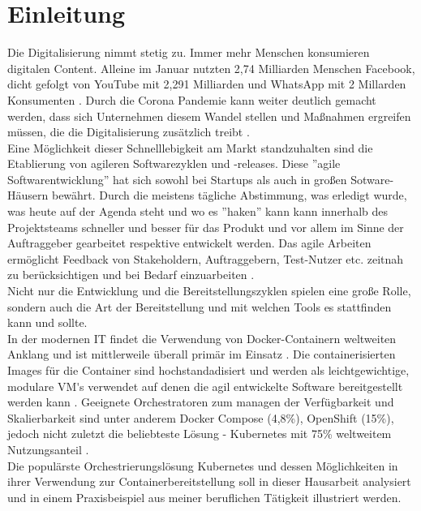 \section{Einleitung}

Die Digitalisierung nimmt stetig zu. Immer mehr Menschen konsumieren digitalen Content. Alleine im Januar nutzten 2,74 Milliarden Menschen Facebook, dicht gefolgt von YouTube mit 2,291 Milliarden und WhatsApp mit 2 Millarden Konsumenten \parencite[vgl.][]{Statista181086}. Durch die Corona Pandemie kann weiter deutlich gemacht werden, dass sich Unternehmen diesem Wandel stellen und Maßnahmen ergreifen müssen, die die Digitalisierung zusätzlich treibt \parencite[vgl.][]{StatistaInfografik23499}. 
\\
Eine Möglichkeit dieser Schnelllebigkeit am Markt standzuhalten sind die Etablierung von agileren Softwarezyklen und -releases. Diese ''agile Softwarentwicklung'' hat sich sowohl bei Startups als auch in großen Sotware-Häusern bewährt. Durch die meistens tägliche Abstimmung, was erledigt wurde, was heute auf der Agenda steht und wo es ''haken'' kann kann innerhalb des Projektsteams schneller und besser für das Produkt und vor allem im Sinne der Auftraggeber gearbeitet respektive entwickelt werden. Das agile Arbeiten ermöglicht Feedback von Stakeholdern, Auftraggebern, Test-Nutzer etc. zeitnah zu berücksichtigen und bei Bedarf einzuarbeiten \parencite[vgl.][]{scherzinger2011agil}.
\\
Nicht nur die Entwicklung und die Bereitstellungszyklen spielen eine große Rolle, sondern auch die Art der Bereitstellung und mit welchen Tools es stattfinden kann und sollte. 
\\
In der modernen IT findet die Verwendung von Docker-Containern weltweiten Anklang und ist mittlerweile überall primär im Einsatz \parencite[vgl.][]{Statista1224618}. Die containerisierten Images für die Container sind hochstandadisiert und werden als leichtgewichtige, modulare \ac*{VM's} verwendet auf denen die agil entwickelte Software bereitgestellt werden kann \parencite[vgl.][]{RedHatDockerWhatIs}. Geeignete Orchestratoren zum managen der Verfügbarkeit und Skalierbarkeit sind unter anderem Docker Compose (4,8\%), OpenShift (15\%), jedoch nicht zuletzt die beliebteste Lösung - Kubernetes mit 75\% weltweitem Nutzungsanteil \parencite[vgl.][]{Statista1224681}.
\\
Die populärste Orchestrierungslösung Kubernetes und dessen Möglichkeiten in ihrer Verwendung zur Containerbereitstellung soll in dieser Hausarbeit analysiert und in einem Praxisbeispiel aus meiner beruflichen Tätigkeit illustriert werden.
